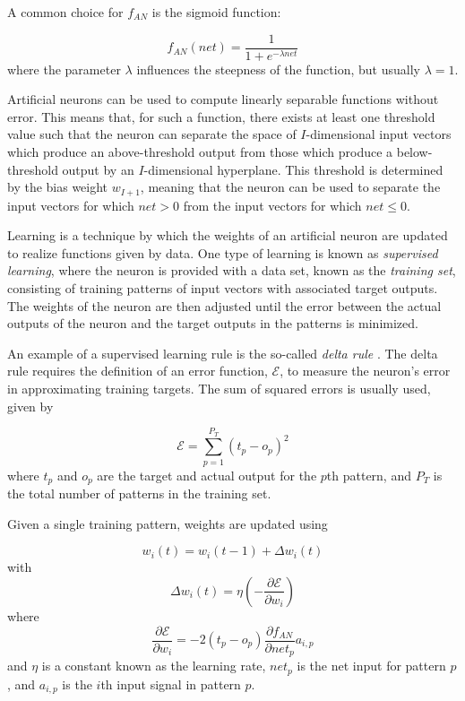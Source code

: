 \documentclass[master]{outhesis}
\begin{document}
A common choice for $f_{AN}$ is the sigmoid function:

\begin{displaymath}
f_{AN}(net) = \frac{1}{1 + e^{-\lambda net}}
\end{displaymath}
where the parameter $\lambda$ influences the steepness of the function, but usually $\lambda = 1$.

Artificial neurons can be used to compute linearly separable functions without error. This means that, for such a function, there exists at least one threshold value such that the neuron can separate the space of $I$-dimensional input vectors which produce an above-threshold output from those which produce a below-threshold output by an $I$-dimensional hyperplane. This threshold is determined by the bias weight $w_{I+1}$, meaning that the neuron can be used to separate the input vectors for which $net > 0$ from the input vectors for which $net \le 0$.

Learning is a technique by which the weights of an artificial neuron are updated to realize functions given by data.
One type of learning is known as \emph{supervised learning}, where the neuron is provided with a data set, known as the \emph{training set}, consisting of training patterns of input vectors with associated target outputs.
The weights of the neuron are then adjusted until the error between the actual outputs of the neuron and the target outputs in the patterns is minimized.

An example of a supervised learning rule is the so-called \emph{delta rule} \citep{Widrow:1960aa}.
The delta rule requires the definition of an error function, $\mathcal{E}$, to measure the neuron's error in approximating training targets.
The sum of squared errors is usually used, given by

\begin{displaymath}
\mathcal{E} = \sum_{p=1}^{P_T}(t_p-o_p)^2
\end{displaymath}
where $t_p$ and $o_p$ are the target and actual output for the $p$th pattern, and $P_T$ is the total number of patterns in the training set.

Given a single training pattern, weights are updated using

\begin{displaymath}
w_i(t) = w_i(t - 1) + \Delta w_i(t)
\end{displaymath}
with
\begin{displaymath}
\Delta w_i(t) = \eta(- \frac{\partial \mathcal{E}}{\partial w_i})
\end{displaymath}
where
\begin{displaymath}
\frac{\partial \mathcal{E}}{\partial w_i} = -2(t_p - o_p)\frac{\partial f_{AN}}{\partial net_p}a_{i,p}
\end{displaymath}
and $\eta$ is a constant known as the learning rate, $net_p$ is the net input for pattern $p$, and $a_{i,p}$ is the $i$th input signal in pattern $p$.
\end{document}
